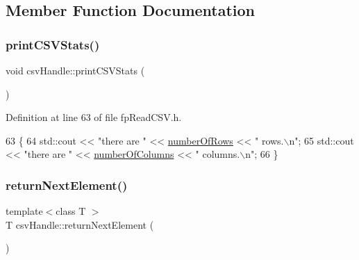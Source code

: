 \subsection{Member Function Documentation}
\mbox{\label{classcsvHandle_a571c2b5fcec86782f43b18dab07c9c26}} 
\subsubsection{\texorpdfstring{print\+C\+S\+V\+Stats()}{printCSVStats()}}
{\footnotesize\ttfamily void csv\+Handle\+::print\+C\+S\+V\+Stats (\begin{DoxyParamCaption}{ }\end{DoxyParamCaption})\hspace{0.3cm}{\ttfamily [inline]}}



Definition at line 63 of file fp\+Read\+C\+S\+V.\+h.


\begin{DoxyCode}
63                             \{
64             std::cout << \textcolor{stringliteral}{"there are "} << \hyperlink{classcsvHandle_a61b2327480d1685e7fd64d4cba139ac5}{numberOfRows} << \textcolor{stringliteral}{" rows.\(\backslash\)n"};
65             std::cout << \textcolor{stringliteral}{"there are "} << \hyperlink{classcsvHandle_aee792b10c2ad6e21c68cfe84d6b7ff46}{numberOfColumns} << \textcolor{stringliteral}{" columns.\(\backslash\)n"};
66         \}
\end{DoxyCode}
\mbox{\label{classcsvHandle_a28f8ee0fa06f1c78132b3551da272bde}} 
\subsubsection{\texorpdfstring{return\+Next\+Element()}{returnNextElement()}}
{\footnotesize\ttfamily template$<$class T $>$ \\
T csv\+Handle\+::return\+Next\+Element (\begin{DoxyParamCaption}{ }\end{DoxyParamCaption})\hspace{0.3cm}{\ttfamily [inline]}}



